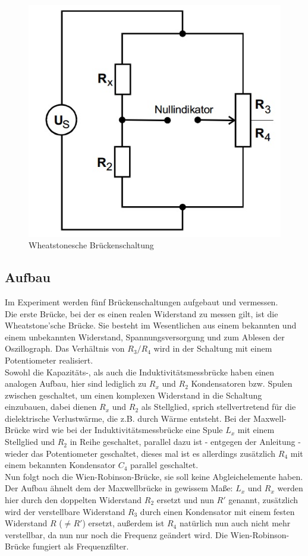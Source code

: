 \begin{figure}
       \includegraphics[scale=0.5]{Grafiken/Wheat}
       \caption{Wheatstonesche Brückenschaltung \cite{V302}}
       \label{fig:Wheat}
\end{figure}
\subsection{Aufbau}
Im Experiment werden fünf Brückenschaltungen aufgebaut und vermessen. \\
Die erste Brücke, bei der es einen realen Widerstand zu messen gilt, ist die Wheatstone'sche Brücke. Sie besteht im Wesentlichen aus einem bekannten und einem unbekannten Widerstand, Spannungsversorgung und zum Ablesen der Oszillograph. Das Verhältnis von $R_3/R_4$ wird in der Schaltung mit einem Potentiometer realisiert.\\
Sowohl die Kapazitäts-, als auch die Induktivitätsmessbrücke haben einen analogen Aufbau, hier sind lediglich zu $R_x$ und $R_2$ Kondensatoren bzw. Spulen zwischen geschaltet, um einen komplexen Widerstand in die Schaltung einzubauen, dabei dienen $R_x$ und $R_2$ als Stellglied, sprich stellvertretend für die dielektrische Verlustwärme, die z.B. durch Wärme entsteht.
Bei der Maxwell-Brücke wird wie bei der Induktivitätsmessbrücke eine Spule $L_x$ mit einem Stellglied und $R_2$ in Reihe geschaltet, parallel dazu ist - entgegen der Anleitung - wieder das Potentiometer geschaltet, dieses mal ist es allerdings zusätzlich $R_4$ mit einem bekannten Kondensator $C_4$ parallel geschaltet.\\
Nun folgt noch die Wien-Robinson-Brücke, sie soll keine Abgleichelemente haben.
Der Aufbau ähnelt dem der Maxwellbrücke in gewissem Maße: $L_x$ und $R_x$ werden hier durch den doppelten Widerstand $R_2$ ersetzt und nun $R'$ genannt, zusätzlich wird der verstellbare Widerstand $R_3$ durch einen Kondensator mit einem festen Widerstand $R$ ($\neq R'$) ersetzt, außerdem ist $R_4$ natürlich nun auch nicht mehr verstellbar, da nun nur noch die Frequenz geändert wird.
Die Wien-Robinson-Brücke fungiert als Frequenzfilter. \\

